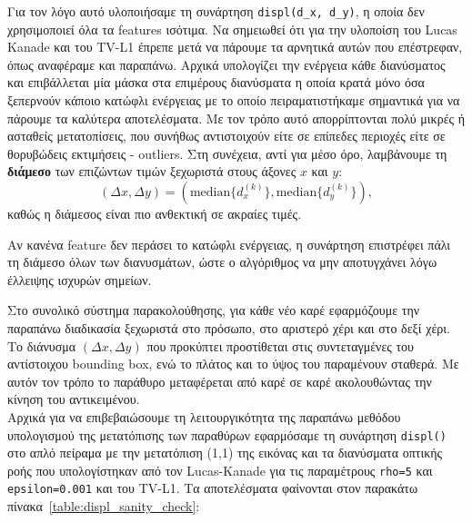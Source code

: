 \documentclass[12pt, a4paper]{article}
\begin{document}
Για τον λόγο αυτό υλοποιήσαμε τη συνάρτηση \texttt{displ(d\_x, d\_y)}, η οποία δεν χρησιμοποιεί όλα τα features ισότιμα. Να σημειωθεί ότι για την υλοποίση του Lucas Kanade και του TV-L1 έπρεπε μετά να πάρουμε τα αρνητικά αυτών που επέστρεφαν, όπως αναφέραμε και παραπάνω. Αρχικά υπολογίζει την ενέργεια κάθε διανύσματος και επιβάλλεται μία μάσκα στα επιμέρους διανύσματα η οποία κρατά μόνο όσα ξεπερνούν κάποιο κατώφλι ενέργειας με το οποίο πειραματιστήκαμε σημαντικά για να πάρουμε τα καλύτερα αποτελέσματα.
Με τον τρόπο αυτό απορρίπτονται πολύ μικρές ή ασταθείς μετατοπίσεις, που συνήθως αντιστοιχούν είτε σε επίπεδες περιοχές είτε σε θορυβώδεις εκτιμήσεις - outliers. Στη συνέχεια, αντί για μέσο όρο, λαμβάνουμε τη \textbf{διάμεσο} των επιζώντων τιμών ξεχωριστά στους άξονες $x$ και $y$:
\begin{equation}
(\Delta x, \Delta y) = \left(\mathrm{median}\{d_x^{(k)}\}, \mathrm{median}\{d_y^{(k)}\}\right),
\end{equation}
καθώς η διάμεσος είναι πιο ανθεκτική σε ακραίες τιμές.

Αν κανένα feature δεν περάσει το κατώφλι ενέργειας, η συνάρτηση επιστρέφει πάλι τη διάμεσο όλων των διανυσμάτων, ώστε ο αλγόριθμος να μην αποτυγχάνει λόγω έλλειψης ισχυρών σημείων.

Στο συνολικό σύστημα παρακολούθησης, για κάθε νέο καρέ εφαρμόζουμε την παραπάνω διαδικασία ξεχωριστά στο πρόσωπο, στο αριστερό χέρι και στο δεξί χέρι. Το διάνυσμα $(\Delta x,\Delta y)$ που προκύπτει προστίθεται στις συντεταγμένες του αντίστοιχου bounding box, ενώ το πλάτος και το ύψος του παραμένουν σταθερά. Με αυτόν τον τρόπο το παράθυρο μεταφέρεται από καρέ σε καρέ ακολουθώντας την κίνηση του αντικειμένου.\\
Αρχικά για να επιβεβαιώσουμε τη λειτουργικότητα της παραπάνω μεθόδου υπολογισμού της μετατόπισης των παραθύρων εφαρμόσαμε τη συνάρτηση \texttt{displ()} στο απλό πείραμα με την μετατόπιση (1,1) της εικόνας και τα διανύσματα οπτικής ροής που υπολογίστηκαν από τον Lucas-Kanade για τις παραμέτρους \texttt{rho=5} και \texttt{epsilon=0.001} και του TV-L1. Τα αποτελέσματα φαίνονται στον παρακάτω πίνακα~\ref{table:displ_sanity_check}:
\end{document}
